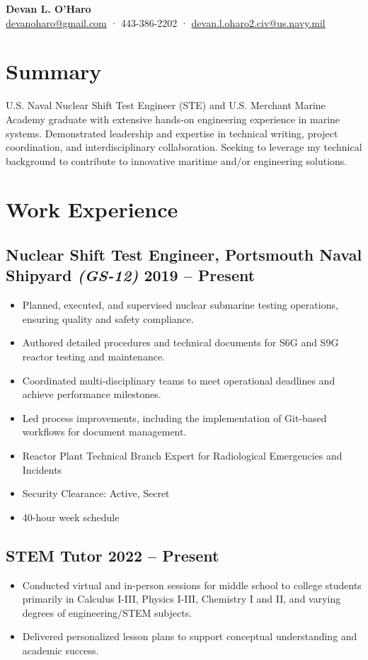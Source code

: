 \documentclass[10pt,a4paper]{article}
\begin{document}
\begin{center}
    \textbf{\Large Devan L. O'Haro} \\
    \href{mailto:devanoharo@gmail.com}{devanoharo@gmail.com} · 443-386-2202 · \href{mailto:devan.l.oharo2.civ@us.navy.mil}{devan.l.oharo2.civ@us.navy.mil}
\end{center}

\section*{Summary}
U.S. Naval Nuclear Shift Test Engineer (STE) and U.S. Merchant Marine Academy graduate with extensive hands-on engineering experience in marine systems. Demonstrated leadership and expertise in technical writing, project coordination, and interdisciplinary collaboration. Seeking to leverage my technical background to contribute to innovative maritime and/or engineering solutions.

\section*{Work Experience}
\subsection{Nuclear Shift Test Engineer, Portsmouth Naval Shipyard \emph{(GS-12)} \hfill 2019 -- Present}
\begin{itemize}[noitemsep]
    \item Planned, executed, and supervised nuclear submarine testing operations, ensuring quality and safety compliance.
    \item Authored detailed procedures and technical documents for S6G and S9G reactor testing and maintenance.
    \item Coordinated multi-disciplinary teams to meet operational deadlines and achieve performance milestones.
    \item Led process improvements, including the implementation of Git-based workflows for document management.
    \item Reactor Plant Technical Branch Expert for Radiological Emergencies and Incidents
    \item Security Clearance: Active, Secret
    \item 40-hour week schedule
\end{itemize}

\subsection{STEM Tutor \hfill 2022 -- Present}
\begin{itemize}[noitemsep]
    \item Conducted virtual and in-person sessions for middle school to college students primarily in Calculus I-III, Physics I-III, Chemistry I and II, and varying degrees of engineering/STEM subjects.
    \item Delivered personalized lesson plans to support conceptual understanding and academic success.
\end{itemize}
\end{document}
